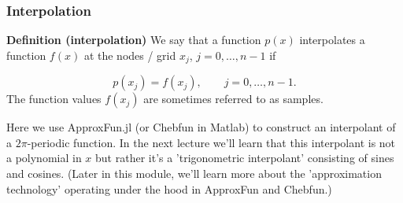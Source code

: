 \documentclass[12pt,a4paper]{article}
\begin{document}
\subsubsection{Interpolation}
\textbf{Definition (interpolation)}  We say that a function $p(x)$ interpolates a function $f(x)$ at the nodes / grid $x_{j}$, $j = 0, \ldots, n-1$ if 

\[
p(x_j) = f(x_j), \qquad j = 0, \ldots, n-1.
\]
The function values $f(x_j)$ are sometimes referred to as samples.

Here we use ApproxFun.jl (or Chebfun in Matlab) to construct an interpolant of a $2\pi$-periodic function.  In the next lecture we'll learn that this interpolant is not a polynomial in $x$ but rather it's a 'trigonometric interpolant' consisting of sines and cosines. (Later in this module, we'll learn more about the 'approximation technology' operating under the hood in ApproxFun and Chebfun.)
\end{document}
